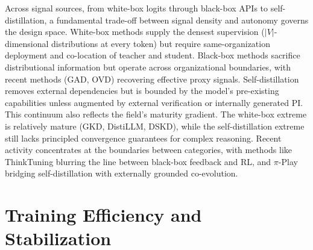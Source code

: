 \documentclass{article} %
\begin{document}
Across signal sources, from white-box logits through black-box APIs to self-distillation, a fundamental trade-off between signal density and autonomy governs the design space. White-box methods supply the densest supervision ($|V|$-dimensional distributions at every token) but require same-organization deployment and co-location of teacher and student. Black-box methods sacrifice distributional information but operate across organizational boundaries, with recent methods (GAD, OVD) recovering effective proxy signals. Self-distillation removes external dependencies but is bounded by the model's pre-existing capabilities unless augmented by external verification or internally generated PI. This continuum also reflects the field's maturity gradient. The white-box extreme is relatively mature (GKD, DistiLLM, DSKD), while the self-distillation extreme still lacks principled convergence guarantees for complex reasoning. Recent activity concentrates at the boundaries between categories, with methods like ThinkTuning blurring the line between black-box feedback and RL, and $\pi$-Play bridging self-distillation with externally grounded co-evolution.

\section{Training Efficiency and Stabilization}
\label{sec:dynamics}
\end{document}
